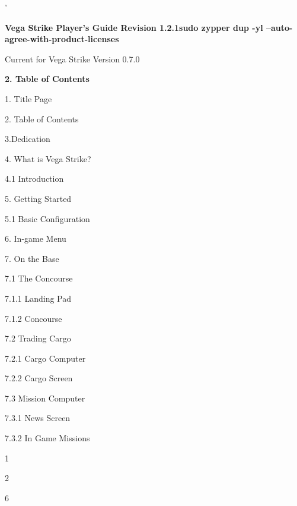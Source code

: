 \documentclass{article}
\begin{document}

 ' 









\textbf{Vega Strike Player's Guide Revision 1.2.1sudo zypper dup -yl --auto-agree-with-product-licenses
}

Current for Vega Strike Version 0.7.0 



\textbf{2. Table of Contents }

1. Title Page



2. Table of Contents



3.Dedication



4. What is Vega Strike?



 4.1 Introduction



5. Getting Started 

 

5.1 Basic Configuration



6. In-game Menu



7. On the Base

 

 7.1 The Concourse



  7.1.1 Landing Pad



  7.1.2 Concourse 



7.2 Trading Cargo  

7.2.1 Cargo Computer  



7.2.2 Cargo Screen  



7.3 Mission Computer   

7.3.1 News Screen  



7.3.2 In Game Missions  

1



2



6
\end{document}
